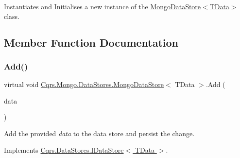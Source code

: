 Instantiates and Initialises a new instance of the \hyperlink{classCqrs_1_1Mongo_1_1DataStores_1_1MongoDataStore_a39f738d53074a548e6932bacdc4a4e3a_a39f738d53074a548e6932bacdc4a4e3a}{Mongo\+Data\+Store$<$\+T\+Data$>$} class. 



\subsection{Member Function Documentation}
\mbox{\label{classCqrs_1_1Mongo_1_1DataStores_1_1MongoDataStore_a27bcfb40fe8203e09d320b2aa19fff3a_a27bcfb40fe8203e09d320b2aa19fff3a}} 
\subsubsection{\texorpdfstring{Add()}{Add()}\hspace{0.1cm}{\footnotesize\ttfamily [1/2]}}
{\footnotesize\ttfamily virtual void \hyperlink{classCqrs_1_1Mongo_1_1DataStores_1_1MongoDataStore}{Cqrs.\+Mongo.\+Data\+Stores.\+Mongo\+Data\+Store}$<$ T\+Data $>$.Add (\begin{DoxyParamCaption}\item[{T\+Data}]{data }\end{DoxyParamCaption})\hspace{0.3cm}{\ttfamily [virtual]}}



Add the provided {\itshape data}  to the data store and persist the change. 



Implements \hyperlink{interfaceCqrs_1_1DataStores_1_1IDataStore_a114404daaf37fec9cc5547cd9a17858c_a114404daaf37fec9cc5547cd9a17858c}{Cqrs.\+Data\+Stores.\+I\+Data\+Store$<$ T\+Data $>$}.

\mbox{\label{classCqrs_1_1Mongo_1_1DataStores_1_1MongoDataStore_a38c242b255dc17cf8d19470fdf5a99bf_a38c242b255dc17cf8d19470fdf5a99bf}} 

